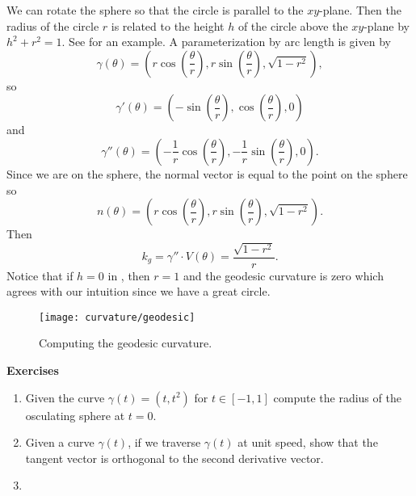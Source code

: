 \begin{example}\label{eqn:circles-on-sphere}
	We can rotate the sphere so that the circle is parallel to the $xy$-plane.
	Then the radius of the circle $r$ is related to the height $h$ of the circle above the $xy$-plane
	by $h^2+r^2=1$. See  for an example.
	A parameterization by arc length is given by
	$$\gamma(\theta)=\left(r\cos\left(\frac{\theta}{r}\right),r\sin\left(\frac{\theta}{r}\right),\sqrt{1-r^2}\right),$$
	so
	$$\gamma'(\theta)=\left(-\sin\left(\frac{\theta}{r}\right),\cos\left(\frac{\theta}{r}\right),0\right)$$
	and
	$$\gamma''(\theta)=\left(-\frac{1}{r}\cos\left(\frac{\theta}{r}\right),-\frac{1}{r}\sin\left(\frac{\theta}{r}\right),0\right).$$
	Since we are on the sphere, the normal vector is equal to the point on the sphere
	so $$n(\theta)=\left(r\cos\left(\frac{\theta}{r}\right),r\sin\left(\frac{\theta}{r}\right),\sqrt{1-r^2}\right).$$
	Then 
	$$k_g=\gamma''\cdot V(\theta)=\frac{\sqrt{1-r^2}}{r}.$$
	Notice that if $h=0$ in , then $r=1$ and the geodesic curvature is zero which
	agrees with our intuition since we have a great circle.
\end{example}

\begin{figure}[htb]
	\centering
	\texttt{[image: curvature/geodesic]}
	\caption{Computing the geodesic curvature.}
	\label{fig:geodesic}
\end{figure}



\noindent \textbf{Exercises}


\begin{enumerate}
	\item Given the curve $\gamma(t)=(t,t^2)$ for $t\in[-1,1]$ compute 
	the radius of the osculating sphere at $t=0.$
	
	\item Given a curve $\gamma(t)$, if we traverse $\gamma(t)$ at unit speed,
	show that the tangent vector is orthogonal to the second derivative vector.
	
	\item 
	
\end{enumerate}

\pagebreak
